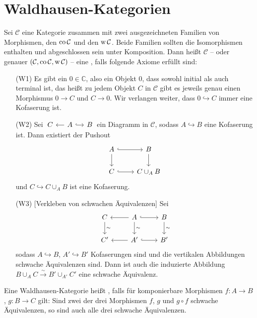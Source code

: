 \section{Waldhausen-Kategorien} %
\label{sec:5}


\begin{definition}[{name=[{Waldhausen Kategorie}]}]
	Sei $\mathcal{C}$ eine Kategorie zusammen mit zwei ausgezeichneten Familien von Morphismen, den  $\operatorname{co} \mathcal{C}$ und den  $\operatorname{w} \mathcal{C}$.
	Beide Familien sollten die Isomorphismen enthalten und abgeschlossen sein unter Komposition.
	Dann heißt $\mathcal{C}$ -- oder genauer $(\mathcal{C},\operatorname{co} \mathcal{C},\operatorname{w} \mathcal{C})$ -- eine , falls folgende Axiome erfüllt sind:
	\begin{enumerate}[(i)]
		\item[(W1)] Es gibt ein  $0 \in \mathbb{C}$, also ein Objekt $0$, dass sowohl initial als auch terminal ist, das heißt zu jedem Objekt $C$ in $\mathcal{C}$ gibt es jeweils genau einen Morphismus $0 \to C$ und $C \to 0$. 
		Wir verlangen weiter, dass $0 \hookrightarrow C$ immer eine Kofaserung ist.
		\item[(W2)] Sei $\!\begin{tikzcd}[sep=small] C & A \lar \rar[hook] & B \end{tikzcd}\!$ ein Diagramm in $\mathcal{C}$, sodass $A \hookrightarrow B$ eine Kofaserung ist.
		Dann existiert der Pushout
		\[
			\begin{tikzcd}
				A \rar[hook] \dar & B \dar  \\
				C \rar[hook] & C \cup_A B
			\end{tikzcd}
		\]
		und $C \hookrightarrow C \cup_A B$ ist eine Kofaserung.
		\item[(W3)] [Verkleben von schwachen Äquivalenzen] Sei 
		\[
			\begin{tikzcd}
				C \dar["\sim"] & A \lar \dar["\sim"] \rar[hook] & B \dar["\sim"] \\
				C' & A' \lar \rar[hook] & B'
			\end{tikzcd}
		\] 
		sodass $A \hookrightarrow B$, $A' \hookrightarrow B'$ Kofaserungen sind und die vertikalen Abbildungen schwache Äquivalenzen sind.
		Dann ist auch die induzierte Abbildung $B \cup_A C \xrightarrow{\sim} B' \cup_{A'} C'$ eine schwache Äquivalenz.
	\end{enumerate}
	Eine Waldhausen-Kategorie heißt , falls für komponierbare Morphismen $f \colon A \to B$, $g \colon B \to C$ gilt:
	Sind zwei der drei Morphismen $f$, $g$ und $ g \circ f$ schwache Äquivalenzen, so sind auch alle drei schwache Äquivalenzen.
\end{definition}

